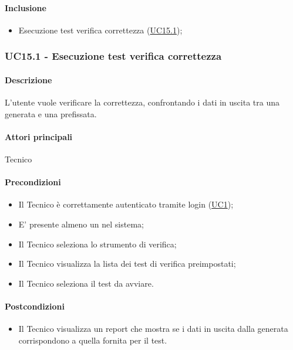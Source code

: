 \paragraph*{Inclusione}
\begin{itemize}
  \item Esecuzione test verifica correttezza (\hyperref[UC15point1]{UC15.1});
\end{itemize}


\subsubsection{UC15.1 - Esecuzione test verifica correttezza}\label{UC15point1}
\paragraph*{Descrizione}
L’utente vuole verificare la correttezza, confrontando i dati in uscita tra una  generata e una prefissata.

\paragraph*{Attori principali}
Tecnico

\paragraph*{Precondizioni}
\begin{itemize}
  \item Il Tecnico è correttamente autenticato tramite login (\hyperref[UC1]{UC1});
  \item E’ presente almeno un nel sistema;
  \item Il Tecnico seleziona lo strumento di verifica;
  \item Il Tecnico visualizza la lista dei test di verifica preimpostati; %
  \item Il Tecnico seleziona il test da avviare. %
\end{itemize}

\paragraph*{Postcondizioni}
\begin{itemize}
  \item Il Tecnico visualizza un report che mostra se i dati in uscita dalla  generata corrispondono a quella fornita per il test.
\end{itemize}


